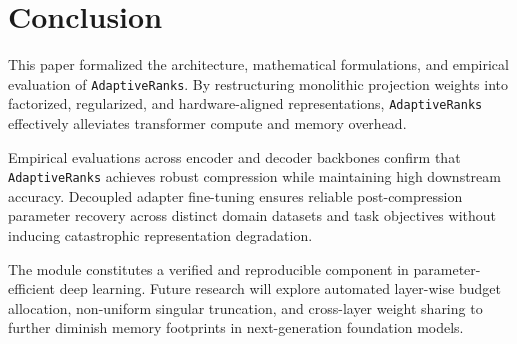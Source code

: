 \section{Conclusion}
This paper formalized the architecture, mathematical formulations, and empirical evaluation of \texttt{AdaptiveRanks}. By restructuring monolithic projection weights into factorized, regularized, and hardware-aligned representations, \texttt{AdaptiveRanks} effectively alleviates transformer compute and memory overhead.

Empirical evaluations across encoder and decoder backbones confirm that \texttt{AdaptiveRanks} achieves robust compression while maintaining high downstream accuracy. Decoupled adapter fine-tuning ensures reliable post-compression parameter recovery across distinct domain datasets and task objectives without inducing catastrophic representation degradation.

The module constitutes a verified and reproducible component in parameter-efficient deep learning. Future research will explore automated layer-wise budget allocation, non-uniform singular truncation, and cross-layer weight sharing to further diminish memory footprints in next-generation foundation models.
